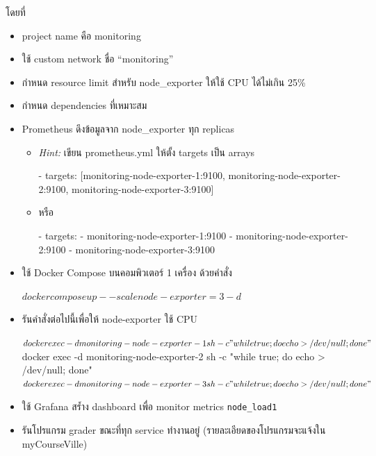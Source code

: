 \documentclass[a4paper, 10pt]{article}
\begin{document}
\par\noindent \textthai{โดยที่}
\begin{itemize}
	\item project name \textthai{คือ} monitoring
	\item \textthai{ใช้} custom network \textthai{ชื่อ} ``monitoring''
	\item \textthai{กำหนด} resource limit \textthai{สำหรับ} node\_exporter \textthai{ให้ใช้} CPU \textthai{ได้ไม่เกิน} 25\%
	\item \textthai{กำหนด} dependencies \textthai{ที่เหมาะสม}
	\item Prometheus \textthai{ดึงข้อมูลจาก} node\_exporter \textthai{ทุก} replicas
	      \begin{itemize}
		      \item \textit{Hint:} \textthai{เขียน} prometheus.yml \textthai{ให้ตั้ง} targets \textthai{เป็น} arrays
		            \begin{codingbox}[language=yaml]
- targets: [monitoring-node-exporter-1:9100, monitoring-node-exporter-2:9100, monitoring-node-exporter-3:9100]
\end{codingbox}
		      \item \textthai{หรือ}
		            \begin{codingbox}[language=yaml]
- targets:
  - monitoring-node-exporter-1:9100
  - monitoring-node-exporter-2:9100
  - monitoring-node-exporter-3:9100
\end{codingbox}
	      \end{itemize}
	\item \textthai{ใช้} Docker Compose \textthai{บนคอมพิวเตอร์} 1 \textthai{เครื่อง} \textthai{ด้วยคำสั่ง}
	      \begin{codingbox}[language=bash]
$ docker compose up --scale node-exporter=3 -d
$
\end{codingbox}
	\item \textthai{รันคำสั่งต่อไปนี้เพื่อให้} node-exporter \textthai{ใช้} CPU
	      \begin{codingbox}[language=bash]
$ docker exec -d monitoring-node-exporter-1 sh -c "while true; do echo > /dev/null; done"
$ docker exec -d monitoring-node-exporter-2 sh -c "while true; do echo > /dev/null; done"
$ docker exec -d monitoring-node-exporter-3 sh -c "while true; do echo > /dev/null; done"
$
\end{codingbox}
	\item \textthai{ใช้} Grafana \textthai{สร้ำง} dashboard \textthai{เพื่อ} monitor metrics \texttt{node\_load1}
	\item \textthai{รันโปรแกรม} grader \textthai{ขณะที่ทุก} service
	      \textthai{ทำงานอยู่ (รายละเอียดของโปรแกรมจะแจ้งใน myCourseVille)}
\end{itemize}
\end{document}
